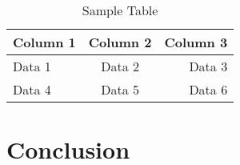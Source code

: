 \documentclass[12pt]{article}
\begin{document}
\begin{table}[h!]
    \centering
    \begin{tabular}{lcr}
        \toprule
        Column 1 & Column 2 & Column 3 \\
        \midrule
        Data 1   & Data 2   & Data 3   \\
        Data 4   & Data 5   & Data 6   \\
        \bottomrule
    \end{tabular}
    \caption{Sample Table}
    \label{tab:sample}
\end{table}

\section{Conclusion}

\printbibliography
\end{document}
